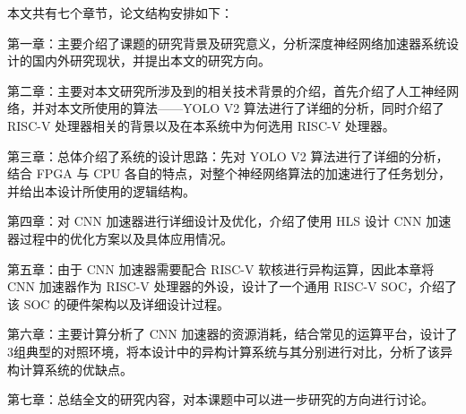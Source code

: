 本文共有七个章节，论文结构安排如下：

第一章：主要介绍了课题的研究背景及研究意义，分析深度神经网络加速器系统设计的国内外研究现状，并提出本文的研究方向。

第二章：主要对本文研究所涉及到的相关技术背景的介绍，首先介绍了人工神经网络，并对本文所使用的算法——YOLO V2 算法进行了详细的分析，同时介绍了 RISC-V 处理器相关的背景以及在本系统中为何选用 RISC-V 处理器。

第三章：总体介绍了系统的设计思路：先对 YOLO V2 算法进行了详细的分析，结合 FPGA 与 CPU 各自的特点，对整个神经网络算法的加速进行了任务划分，并给出本设计所使用的逻辑结构。

第四章：对 CNN 加速器进行详细设计及优化，介绍了使用 HLS 设计 CNN 加速器过程中的优化方案以及具体应用情况。

第五章：由于 CNN 加速器需要配合 RISC-V 软核进行异构运算，因此本章将 CNN 加速器作为 RISC-V 处理器的外设，设计了一个通用 RISC-V SOC，介绍了该 SOC 的硬件架构以及详细设计过程。

第六章：主要计算分析了 CNN 加速器的资源消耗，结合常见的运算平台，设计了3组典型的对照环境，将本设计中的异构计算系统与其分别进行对比，分析了该异构计算系统的优缺点。

第七章：总结全文的研究内容，对本课题中可以进一步研究的方向进行讨论。



